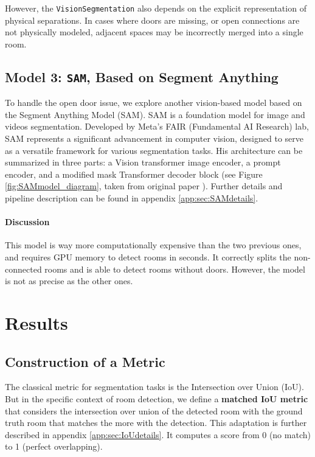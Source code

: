 \documentclass[11pt]{article}
\begin{document}
However, the \texttt{VisionSegmentation} also depends on the explicit representation of physical separations. 
In cases where doors are missing, or open connections are not physically modeled, 
adjacent spaces may be incorrectly merged into a single room.


\subsection{Model 3: \texttt{SAM}, Based on Segment Anything}
To handle the open door issue, we explore another vision-based model 
based on the Segment Anything Model 
(SAM)\cite{kirillov2023segment}. SAM is a foundation model for image and videos segmentation. Developed by 
Meta's FAIR (Fundamental AI Research) lab, SAM represents a significant advancement 
in computer vision, designed to serve as a versatile framework for various 
segmentation tasks. His architecture can be summarized in three parts: a Vision 
transformer image encoder, a prompt encoder, and a modified mask Transformer decoder
 block (see Figure \ref{fig:SAMmodel_diagram}, taken from original paper \cite{kirillov2023segment}).
 Further details and pipeline description 
 can be found in appendix \ref{app:sec:SAMdetails}. 

\paragraph{Discussion}
This model is way more computationally expensive than the two previous ones, 
and requires GPU memory to detect rooms in seconds. It correctly splits
the non-connected rooms and is able to detect rooms without doors.
However, the model is not as precise as the other ones.



\section{Results}

\subsection{Construction of a Metric}
\label{sec:metric}
The classical metric for segmentation tasks is the Intersection over Union (IoU).
But in the specific context of room detection, we define a \textbf{matched IoU
metric} that considers the intersection over union of the detected room with the
ground truth room that matches the more with the detection.
This adaptation is further described in appendix 
\ref{app:sec:IoUdetails}. It computes a score from 0 (no match) to 1 (perfect 
overlapping). 
\end{document}
